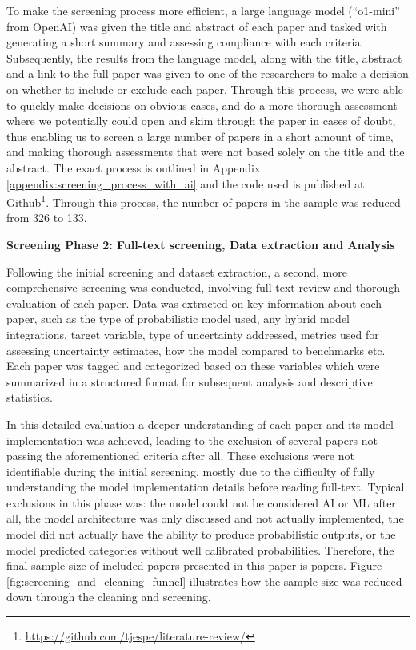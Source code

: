 To make the screening process more efficient, a large language model (``o1-mini'' from OpenAI) was given the title and abstract of each paper and tasked with generating a short summary and assessing compliance with each criteria. Subsequently, the results from the language model, along with the title, abstract and a link to the full paper was given to one of the researchers to make a decision on whether to include or exclude each paper. Through this process, we were able to quickly make decisions on obvious cases, and do a more thorough assessment where we potentially could open and skim through the paper in cases of doubt, thus enabling us to screen a large number of papers in a short amount of time, and making thorough assessments that were not based solely on the title and the abstract. The exact process is outlined in Appendix \ref{appendix:screening_process_with_ai} and the code used is published at \href{https://github.com/tjespe/literature-review/}{Github}\footnote{\label{footnote:github_link}\href{https://github.com/tjespe/literature-review/}{https://github.com/tjespe/literature-review/}}. Through this process, the number of papers in the sample was reduced from 326 to 133.




\textbf{Screening Phase 2: Full-text screening, Data extraction and Analysis}\nopagebreak

Following the initial screening and dataset extraction, a second, more comprehensive screening was conducted, involving full-text review and thorough evaluation of each paper. Data was extracted on key information about each paper, such as the type of probabilistic model used, any hybrid model integrations, target variable, type of uncertainty addressed, metrics used for assessing uncertainty estimates, how the model compared to benchmarks etc. Each paper was tagged and categorized based on these variables which were summarized in a structured format for subsequent analysis and descriptive statistics. 

In this detailed evaluation a deeper understanding of each paper and its model implementation was achieved, leading to the exclusion of several papers not passing the aforementioned criteria after all. These exclusions were not identifiable during the initial screening, mostly due to the difficulty of fully understanding the model implementation details before reading full-text. Typical exclusions in this phase was: the model could not be considered AI or ML after all, the model architecture was only discussed and not actually implemented, the model did not actually have the ability to produce probabilistic outputs, or the model predicted categories without well calibrated probabilities. Therefore, the final sample size of included papers presented in this paper is \samplesize papers. Figure \ref{fig:screening_and_cleaning_funnel} illustrates how the sample size was reduced down through the cleaning and screening. 

